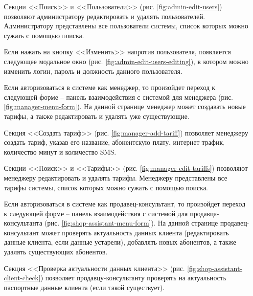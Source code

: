 Секции <<Поиск>> и <<Пользователи>> (рис. \ref{fig:admin-edit-users}) позволяют администратору редактировать и удалять пользователей. Администратору представлены все пользователи системы, список которых можно сужать с помощью поиска.

Если нажать на кнопку <<Изменить>> напротив пользователя, появляется следующее модальное окно (рис. \ref{fig:admin-edit-users-editing}), в котором можно изменить логин, пароль и должность данного пользователя.

Если авторизоваться в системе как менеджер, то произойдет переход к следующей форме -- панель взаимодействия с системой для менеджера (рис. \ref{fig:manager-menu-form}). На данной странице менеджер может создавать новые тарифы, а также редактировать и удалять уже существующие.

Секция <<Создать тариф>> (рис. \ref{fig:manager-add-tariff}) позволяет менеджеру создать тариф, указав его название, абонентскую плату, интернет трафик, количество минут и количество SMS.

Секции <<Поиск>> и <<Тарифы>> (рис. \ref{fig:manager-edit-tariffs}) позволяют менеджеру редактировать и удалять тарифы. Менеджеру представлены все тарифы системы, список которых можно сужать с помощью поиска.

Если авторизоваться в системе как продавец-консультант, то произойдет переход к следующей форме -- панель взаимодействия с системой для продавца-консультанта (рис. \ref{fig:shop-assistant-menu-form}). На данной странице продавец-консультант может проверять актуальность данных клиента (редактировать данные клиента, если данные устарели), добавлять новых абонентов, а также удалять существующих абонентов.

Секция <<Проверка актуальности данных клиента>> (рис. \ref{fig:shop-assistant-client-check}) позволяет продавцу-консультанту проверять на актуальность паспортные данные клиента (если такой существует).

